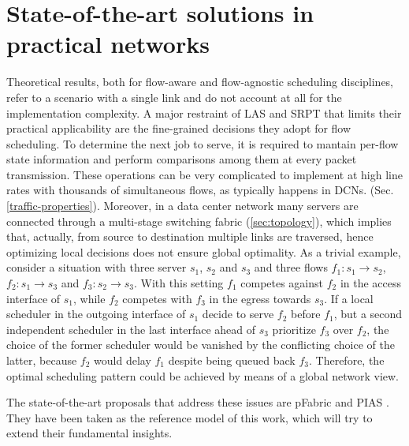 \section{State-of-the-art solutions in practical networks}
Theoretical results, both for flow-aware and flow-agnostic scheduling disciplines, refer to a scenario with a single link and do not account at all for the implementation complexity. A major restraint of LAS and SRPT that limits their practical applicability are the fine-grained decisions they adopt for flow scheduling. To determine the next job to serve, it is required to mantain per-flow state information and perform comparisons among them at every packet transmission. These operations can be very complicated to implement at high line rates with thousands of simultaneous flows, as typically happens in DCNs. (Sec. \ref{traffic-properties}). Moreover, in a data center network many servers are connected through a multi-stage switching fabric (\ref{sec:topology}), which implies that, actually, from source to destination multiple links are traversed, hence optimizing local decisions does not ensure global optimality. As a trivial example, consider a situation with three server $s_1$, $s_2$ and $s_3$ and three flows $f_1:s_1 \longrightarrow s_2$, $f_2:s_1 \longrightarrow s_3$ and $f_3:s_2 \longrightarrow s_3$. With this setting $f_1$ competes against $f_2$ in the access interface of $s_1$, while $f_2$ competes with $f_3$ in the egress towards $s_3$. If a local scheduler in the outgoing interface of $s_1$ decide to serve $f_2$ before $f_1$, but a second independent scheduler in the last interface ahead of $s_3$ prioritize $f_3$ over $f_2$, the choice of the former scheduler would be vanished by the conflicting choice of the latter, because $f_2$ would delay $f_1$ despite being queued back $f_3$. Therefore, the optimal scheduling pattern could be achieved by means of a global network view. 

The state-of-the-art proposals that address these issues are pFabric \cite{pFabric} and PIAS \cite{pias}. They have been taken as the reference model of this work, which will try to extend their fundamental insights.  

